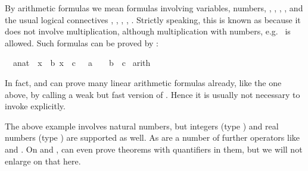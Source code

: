 \begin{isabellebody}
\begin{isamarkuptext}
By arithmetic formulas we mean formulas involving variables, numbers, , , , ,  and the usual logical
connectives , , , ,
. Strictly speaking, this is known as 
because it does not involve multiplication, although multiplication with
numbers, e.g.\  is allowed. Such formulas can be proved by
:%
\end{isamarkuptext}%
\isamarkuptrue%
\isamarkupfalse%
\ {}{}\ {}a{}{}nat{}\ {}\ x\ {}\ b{}\ {}{}x\ {}\ c\ {}\ {}\ {}{}a\ {}\ {}\ {}\ {}{}b\ {}\ c{}\isanewline
%
\isadelimproof
%
\endisadelimproof
%
\isatagproof
{}\isamarkupfalse%
\ arith%
\endisatagproof
{\isafoldproof}%
%
\isadelimproof
%
\endisadelimproof
%
\begin{isamarkuptext}%
In fact,  and  can prove many linear
arithmetic formulas already, like the one above, by calling a weak but fast
version of . Hence it is usually not necessary to invoke
 explicitly.

The above example involves natural numbers, but integers (type )
and real numbers (type ) are supported as well. As are a number
of further operators like  and . On  and
,  can even prove theorems with quantifiers in them,
but we will not enlarge on that here.



\end{isamarkuptext}
\end{isabellebody}

